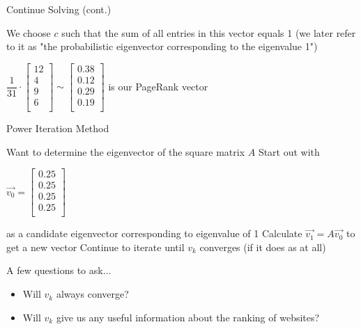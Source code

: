\documentclass{beamer}
\begin{document}
\begin{frame}[t]{Continue Solving (cont.)}
    \begin{outline}
        \1 We choose $c$ such that the sum of all entries in this vector equals 1 (we later refer to it as "the probabilistic eigenvector corresponding to the eigenvalue 1")
        \begin{center}
            \begin{math}
                \dfrac{1}{31}\cdot \begin{bmatrix}
                    12 \\ 4 \\ 9 \\ 6\\
                \end{bmatrix} \sim \begin{bmatrix}
                    0.38 \\ 0.12 \\ 0.29 \\ 0.19\\
                \end{bmatrix}
            \end{math} is our PageRank vector
        \end{center}
    \end{outline}
\end{frame}

\begin{frame}[t]{Power Iteration Method}
    \begin{outline}
        \1 Want to determine the eigenvector of the square matrix $A$
        \1 Start out with 
        \begin{center}
            $\vec{v_0} = \begin{bmatrix}
                0.25 \\ 0.25 \\ 0.25 \\ 0.25 \\
            \end{bmatrix}$
        \end{center}
        as a candidate eigenvector corresponding to eigenvalue of 1
        \1 Calculate $\vec{v_1} = A\vec{v_0}$ to get a new vector
        \1 Continue to iterate until $v_k$ converges (if it does as at all)
    \end{outline}
\end{frame}

\begin{frame}{A few questions to ask$\ldots$}
\Large\begin{itemize}
    \setlength\itemsep{2em}
    \item Will $v_k$ always converge?
    \item Will $v_k$ give us any useful information about the ranking of websites?
\end{itemize}    
\end{frame}
\end{document}
